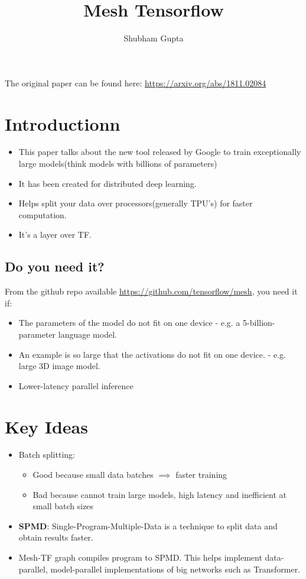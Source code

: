 \documentclass[a4paper]{article}
\title{Mesh Tensorflow}
\author{Shubham Gupta}
\begin{document}
\maketitle
The original paper can be found here: \url{https://arxiv.org/abs/1811.02084}
\section{Introductionn}
\begin{itemize}
    \item This paper talks about the new tool released by Google to train exceptionally large models(think models with billions of parameters)
    \item It has been created for distributed deep learning.
    \item Helps split your data over processors(generally TPU's) for faster computation.
    \item It's a layer over TF. 
\end{itemize}
\subsection{Do you need it?}
From the github repo available \url{https://github.com/tensorflow/mesh}, you need it if:
\begin{itemize}
    \item The parameters of the model do not fit on one device - e.g. a 5-billion-parameter language model.
    \item An example is so large that the activations do not fit on one device. - e.g. large 3D image model.
    \item Lower-latency parallel inference 
\end{itemize}

\section{Key Ideas}
\begin{itemize}
    \item Batch splitting:
    \begin{itemize}
        \item Good because small data batches $\implies$ faster training
        \item Bad because cannot train large models, high latency and inefficient at small batch sizes
    \end{itemize}
    \item \textbf{SPMD}: Single-Program-Multiple-Data is a technique to split data and obtain results faster. 
    \item Mesh-TF graph compiles program to SPMD. This helps implement data-parallel, model-parallel implementations of big networks such as Transformer.
\end{itemize}
\end{document}
